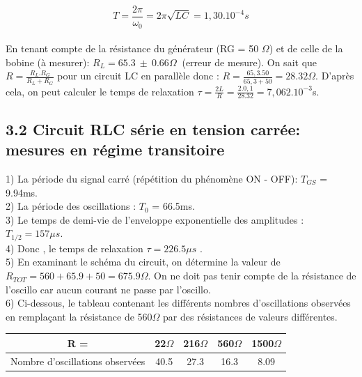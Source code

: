 \documentclass{report}
\begin{document}
$$ T =  \frac{2 \pi}{\omega_{0}} = 2 \pi \sqrt{LC} = 1,30 . 10^{-4}s$$ \\

En tenant compte  de la  résistance  du  générateur (RG =  50 $\Omega$) et  de  celle de  la  bobine  (à mesurer): $ R_{L} = 65.3 \ \pm \ 0.66 \Omega \ $ (erreur de mesure).
On sait que $R=\frac{R_L.R_G}{R_L+R_G} $ pour un circuit LC en parallèle donc :
$R=\frac{65,3.50}{65,3+50} = 28.32\Omega$.
D'après cela, on peut calculer le temps de relaxation $\tau = \frac{2L}{R}=\frac{2.0,1}{28.32}=7,062.10^{-3}$s.

\subsection*{3.2 Circuit RLC série en tension carrée: mesures en régime transitoire}
1) La période du signal carré (répétition du phénomène ON - OFF): $T_{GS}$ = 9.94ms. \\
2) La période des oscillations : $T_{0}$ = 66.5ms.\\
3) Le temps de demi-vie de l'enveloppe exponentielle des amplitudes : $T_{1/2} = 157 \mu s$. \\
4) Donc , le temps de relaxation $\tau = 226.5 \mu s$ . \\
5) En examinant le schéma  du circuit, on détermine la valeur de $R_{TOT} = 560 + 65.9 + 50 = 675.9 \Omega$. On ne doit pas tenir compte de la résistance de l'oscillo car aucun courant ne passe par l'oscillo. \\
6) Ci-dessous, le tableau contenant les différents nombres d'oscillations observées en remplaçant la résistance de 560$\Omega$ par des résistances de valeurs différentes. \\

\begin{tabular}{|c|c|c|c|c|}
  \hline
  R = & 22$\Omega$ & 216$\Omega$ & 560$\Omega$  & 1500$\Omega$ \\
  \hline
  Nombre d'oscillations observées & 40.5 & 27.3 & 16.3 & 8.09 \\
  \hline
\end{tabular}
\end{document}
